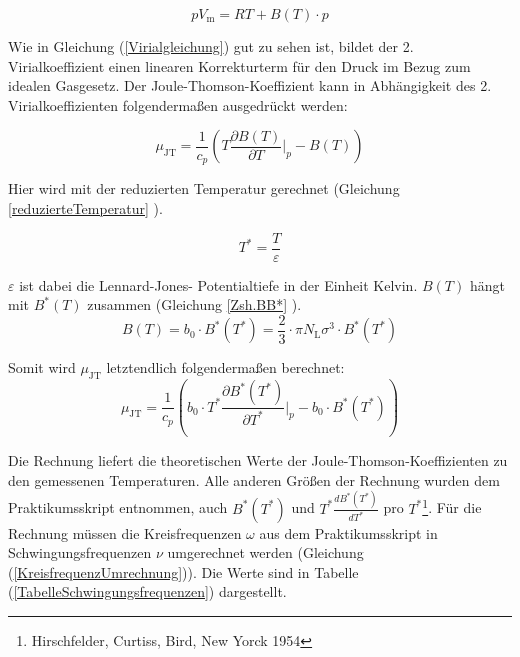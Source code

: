 \documentclass[a4paper,12pt,oneside,onecolum,final,openany]{report}
\begin{document}
\begin{equation}
pV_\mathrm{m} = RT + B(T) \cdot p \label{Virialgleichung}
\end{equation}

Wie in Gleichung (\ref{Virialgleichung}) gut zu sehen ist, bildet der 2. Virialkoeffizient einen linearen Korrekturterm für den Druck im Bezug zum idealen Gasgesetz.
Der Joule-Thomson-Koeffizient kann in Abhängigkeit des 2. Virialkoeffizienten folgendermaßen ausgedrückt werden:

\begin{equation}
\mu_\mathrm{JT} = \frac{1}{c_p}\left( T \frac{\partial B(T)}{\partial T} \bigg \vert_p - B(T)\right)
\end{equation}

Hier wird mit der reduzierten Temperatur gerechnet (Gleichung \ref{reduzierteTemperatur} ). 

\begin{equation}
T^* = \frac{T}{\varepsilon} \label{reduzierteTemperatur}
\end{equation}

$\varepsilon$ ist dabei die Lennard-Jones- Potentialtiefe in der Einheit Kelvin. $B(T)$ hängt mit $B^*(T)$ zusammen (Gleichung \ref{Zsh.BB*} ).\\

\begin{equation}
B(T) = b_0 \cdot B^*(T^*) = \frac{2}{3} \cdot \pi N_\mathrm{L} \sigma^3 \cdot B^*(T^*) \label{Zsh.BB*}
\end{equation}

Somit wird $\mu_\mathrm{JT}$ letztendlich folgendermaßen berechnet:\\

\begin{equation} \label{EndgleichungJT}
\mu_\mathrm{JT} = \frac{1}{c_p}\left(b_0 \cdot T^* \frac{\partial B^*(T^*)}{\partial T^*} \bigg \vert_{p} - b_0 \cdot B^*(T^*)\right)
\end{equation}


Die Rechnung liefert die theoretischen Werte der Joule-Thomson-Koeffizienten zu den gemessenen Temperaturen. Alle anderen Größen der Rechnung wurden dem Praktikumsskript entnommen, auch $B^*(T^*)$ und $T^*\frac{dB^*(T^*)}{dT^*}$ pro $T^*$\protect\footnote{Hirschfelder, Curtiss, Bird, New Yorck 1954}. Für die Rechnung müssen die Kreisfrequenzen $\omega$ aus dem Praktikumsskript in Schwingungsfrequenzen $\nu$ umgerechnet werden (Gleichung (\ref{KreisfrequenzUmrechnung})). Die Werte sind in Tabelle (\ref{TabelleSchwingungsfrequenzen}) dargestellt.  \\
\end{document}
